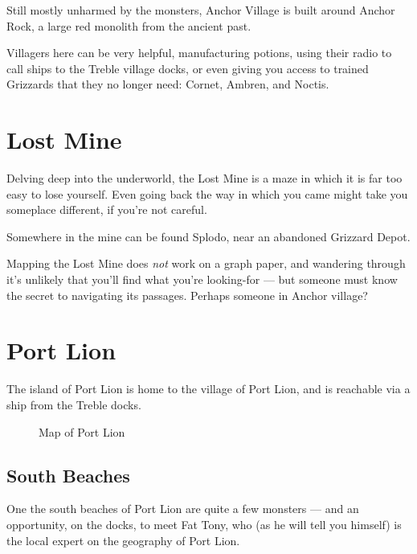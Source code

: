 \documentclass[10pt,twocolumn]{memoir}
\begin{document}
Still mostly  unharmed by the  monsters, Anchor  Village is built  around Anchor
Rock, a large red monolith from the ancient past.

Villagers here can be very helpful,  manufacturing potions, using their radio to
call ships  to the Treble  village docks, or even  giving you access  to trained
Grizzards that they no longer need: Cornet, Ambren, and Noctis.

\section{Lost Mine}

Delving deep into the underworld, the Lost Mine is a maze in which it is far too
easy to lose yourself. Even going back the  way in which you came might take you
someplace different, if you're not careful.

Somewhere in the mine can be found Splodo, near an abandoned Grizzard Depot.

Mapping  the Lost  Mine does  \emph{not} work  on a  graph paper,  and wandering
through it's unlikely  that you'll find what you're looking-for  --- but someone
must know the secret to navigating its passages. Perhaps someone in Anchor village?

\section{Port Lion}

The island of  Port Lion is home to  the village of Port Lion,  and is reachable
via a ship from the Treble docks.

\begin{figure}[ht]
  \begin{center}
  \end{center}
  \caption{Map of Port Lion}
\end{figure}

\subsection{South Beaches}

One  the south  beaches  of  Port Lion  are  quite a  few  monsters  --- and  an
opportunity, on the docks,  to meet Fat Tony, who (as he  will tell you himself)
is the local expert on the geography of Port Lion.
\end{document}
